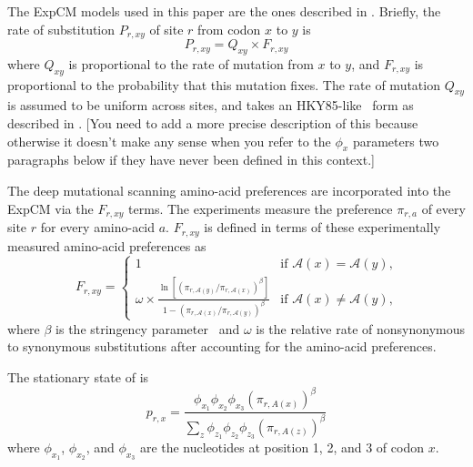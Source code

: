 \documentclass[11pt]{article}
\newcommand\jdbcomment[1]{{\color{red}[#1]}}
\begin{document}
The ExpCM models used in this paper are the ones described in \citet{bloom2017identification}. 
Briefly, the rate of substitution $P_{r,xy}$ of site $r$ from codon $x$ to $y$ is 
\begin{equation}
\label{eq:ExpCM}
P_{r,xy} = Q_{xy} \times F_{r,xy}
\end{equation}
where $Q_{xy}$ is proportional to the rate of mutation from $x$ to $y$, and $F_{r,xy}$ is proportional to the probability that this mutation fixes.
The rate of mutation $Q_{xy}$ is assumed to be uniform across sites, and takes an HKY85-like~\citep{hasegawa1985dating} form as described in \citet{bloom2017identification}.
\jdbcomment{You need to add a more precise description of this because otherwise it doesn't make any sense when you refer to the $\phi_x$ parameters two paragraphs below if they have never been defined in this context.}

The deep mutational scanning amino-acid preferences are incorporated into the ExpCM via the $F_{r,xy}$ terms.
The experiments measure the preference $\pi_{r,a}$ of every site $r$ for every amino-acid $a$.
$F_{r,xy}$ is defined in terms of these experimentally measured amino-acid preferences as
\begin{equation}
\label{eq:Frxy}
F_{r,xy} = 
\begin{cases}
   1 & \mbox{if $\mathcal{A}\left(x\right) = \mathcal{A}\left(y\right)$,} \\
   \omega \times \frac{\ln\left[\left(\pi_{r,\mathcal{A}\left(y\right)} / \pi_{r,\mathcal{A}\left(x\right)}\right)^{\beta}\right]}{1 - \left(\pi_{r,\mathcal{A}\left(x\right)} / \pi_{r,\mathcal{A}\left(y\right)}\right)^{\beta}} & \mbox{if $\mathcal{A}\left(x\right) \ne \mathcal{A}\left(y\right)$,}
   \end{cases}
\end{equation}
where $\beta$ is the stringency parameter~\citet{bloom2014informed,hilton2017phydms} and $\omega$ is the relative rate of nonsynonymous to synonymous substitutions after accounting for the amino-acid preferences.

The stationary state of is 
\begin{equation}
\label{eq:prx}
p_{r,x} = \frac{\phi_{x_1}\phi_{x_2}\phi_{x_3}\left(\pi_{r,A\left(x\right)}\right)^\beta}{\sum_z \phi_{z_1}\phi_{z_2}\phi_{z_3}\left(\pi_{r,A\left(z\right)}\right)^\beta}
\end{equation}
where $\phi_{x_1}$, $\phi_{x_2}$, and $\phi_{x_3}$ are the nucleotides at position 1, 2, and 3 of codon $x$. 
\end{document}

